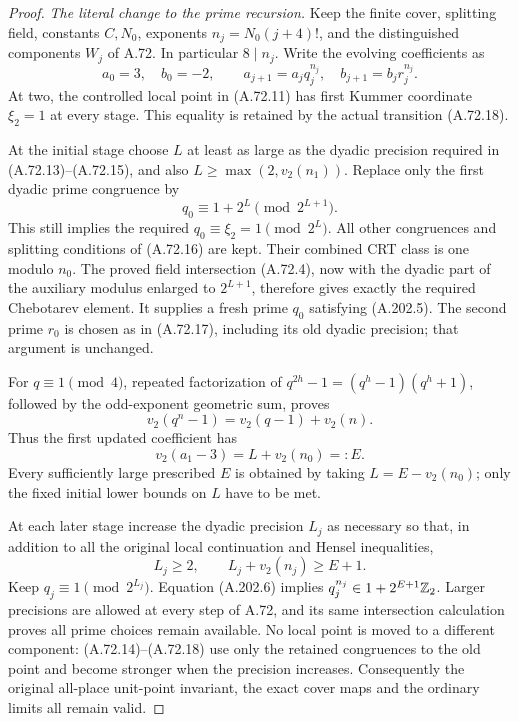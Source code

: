\begin{proof}
\emph{The literal change to the prime recursion.}
Keep the finite cover, splitting field, constants \(C,N_0\),
exponents \(n_j=N_0(j+4)!\), and the distinguished components
\(W_j\) of A.72.  In particular \(8\mid n_j\).
Write the evolving coefficients as
\[
 a_0=3,\quad b_0=-2,\qquad
 a_{j+1}=a_jq_j^{n_j},\quad b_{j+1}=b_jr_j^{n_j}.
\tag{A.202.4}
\]
At two, the controlled local point in (A.72.11) has first
Kummer coordinate \(\xi_2=1\) at every stage.  This equality
is retained by the actual transition (A.72.18).

At the initial stage choose \(L\) at least as large as the
dyadic precision required in (A.72.13)--(A.72.15), and also
\(L\geq\max(2,v_2(n_1))\).  Replace only the first dyadic
prime congruence by
\[
                    q_0\equiv1+2^L\pmod {2^{L+1}}.
\tag{A.202.5}
\]
This still implies the required \(q_0\equiv\xi_2=1\pmod{2^L}\).
All other congruences and splitting conditions of (A.72.16)
are kept.  Their combined CRT class is one modulo \(n_0\).
The proved field intersection (A.72.4), now with the dyadic
part of the auxiliary modulus enlarged to \(2^{L+1}\),
therefore gives exactly the required Chebotarev element.
It supplies a fresh prime \(q_0\) satisfying (A.202.5).
The second prime \(r_0\) is chosen as in (A.72.17), including
its old dyadic precision; that argument is unchanged.

For \(q\equiv1\pmod4\), repeated factorization of
\(q^{2h}-1=(q^h-1)(q^h+1)\), followed by the odd-exponent
geometric sum, proves
\[
             v_2(q^n-1)=v_2(q-1)+v_2(n).
\tag{A.202.6}
\]
Thus the first updated coefficient has
\[
       v_2(a_1-3)=L+v_2(n_0)=:E.
\tag{A.202.7}
\]
Every sufficiently large prescribed \(E\) is obtained by
taking \(L=E-v_2(n_0)\); only the fixed initial lower bounds
on \(L\) have to be met.

At each later stage increase the dyadic precision \(L_j\)
as necessary so that, in addition to all the original local
continuation and Hensel inequalities,
\[
              L_j\geq2,\qquad L_j+v_2(n_j)\geq E+1.
\tag{A.202.8}
\]
Keep \(q_j\equiv1\pmod {2^{L_j}}\).  Equation (A.202.6)
implies \(q_j^{n_j}\in1+2^{E+1}\mathbb Z_2\).
Larger precisions are allowed at every step of A.72, and its
same intersection calculation proves all prime choices remain
available.  No local point is moved to a different component:
(A.72.14)--(A.72.18) use only the retained congruences to the
old point and become stronger when the precision increases.
Consequently the original all-place unit-point invariant,
the exact cover maps and the ordinary limits all remain valid.


\end{proof}
